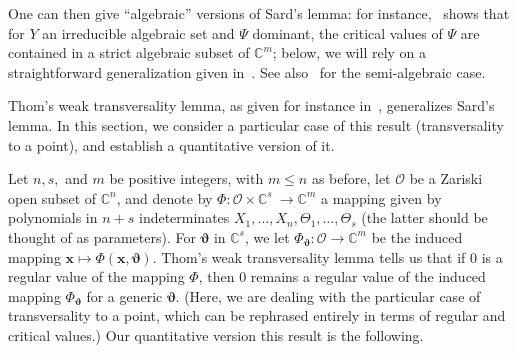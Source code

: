 \documentclass[12pt]{article}
\def\thetab{\bm{\vartheta}}
\def\xb{{\bm x}}
\def\vt{\vartheta}
\def\dt{s}
\def\C{\mathbb{C}}
\begin{document}
One can then give ``algebraic'' versions of Sard's lemma: for
instance,~\cite[(3.7)]{Mumford76} shows that for $Y$ an irreducible
algebraic set and $\Psi$ dominant, the critical values of $\Psi$ are
contained in a strict algebraic subset of $\C^m$; below, we will rely
on a straightforward generalization given in~\cite{TWT}. See
also~\cite[Chapter~9]{bochnak1998real} for the semi-algebraic case.

Thom's weak transversality lemma, as given for instance
in~\cite{demazure2000bifurcations}, generalizes Sard's lemma. In this
section, we consider a particular case of this result (transversality
to a point), and establish a quantitative version of it.

Let $n,\dt,$ and $m$ be positive integers, with $m \le n$ as before,
let $\mathscr{O}$ be a Zariski open subset of $\C^n$, and denote by
$\Phi: \mathscr{O} \times \C^{\dt} ~ \rightarrow \C^{m}$ a mapping
given by polynomials in $n+\dt$ indeterminates
$X_1,\dots,X_n,\Theta_1,\dots,\Theta_\dt$ (the latter should be
thought of as parameters). For $\thetab$ in $\C^{\dt}$, we let
$\Phi_{\thetab} : \mathscr{O} \rightarrow \C^{m}$ be the induced
mapping $\xb\mapsto\Phi(\xb,\thetab)$.  Thom's weak transversality
lemma tells us that if $0$ is a regular value of the mapping $\Phi$,
then $0$ remains a regular value of the induced mapping $\Phi_{\bm
  \vt}$ for a generic $\bm \vt$. (Here, we are dealing with the
particular case of transversality to a point, which can be rephrased
entirely in terms of regular and critical values.)  Our quantitative
version this result is the following.
\end{document}
